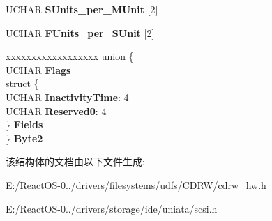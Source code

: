 \begin{DoxyCompactItemize}
\begin{tabbing}
\end{tabbing}\item 
\mbox{\label{struct___m_o_d_e___c_d___p_a_r_a_m_s___p_a_g_e_a73828d42fa48e0f1c3bfd3eaedfa0401}} 
U\+C\+H\+AR {\bfseries S\+Units\+\_\+per\+\_\+\+M\+Unit} \mbox{[}2\mbox{]}
\item 
\mbox{\label{struct___m_o_d_e___c_d___p_a_r_a_m_s___p_a_g_e_adee8c79fd8ae6eb11e8379cd92f3cdfa}} 
U\+C\+H\+AR {\bfseries F\+Units\+\_\+per\+\_\+\+S\+Unit} \mbox{[}2\mbox{]}
\item 
\mbox{\label{struct___m_o_d_e___c_d___p_a_r_a_m_s___p_a_g_e_a84abb06cfd978bff9bc7dd2e1d32f4a8}} 
\begin{tabbing}
xx\=xx\=xx\=xx\=xx\=xx\=xx\=xx\=xx\=\kill
union \{\\
\>UCHAR {\bfseries Flags}\\
\>struct \{\\
\>\>UCHAR {\bfseries InactivityTime}: 4\\
\>\>UCHAR {\bfseries Reserved0}: 4\\
\>\} {\bfseries Fields}\\
\} {\bfseries Byte2}\\

\end{tabbing}\end{DoxyCompactItemize}


该结构体的文档由以下文件生成\+:\begin{DoxyCompactItemize}
\item 
E\+:/\+React\+O\+S-\/0../drivers/filesystems/udfs/\+C\+D\+R\+W/cdrw\+\_\+hw.\+h\item 
E\+:/\+React\+O\+S-\/0../drivers/storage/ide/uniata/scsi.\+h\end{DoxyCompactItemize}
